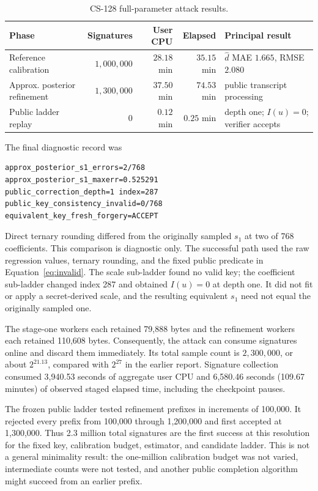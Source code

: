 \documentclass[11pt]{article}
\begin{document}
\begin{table}[ht]
\centering
\caption{CS-128 full-parameter attack results.}
\label{tab:results}
\small
\begin{tabular}{@{}lrrrl@{}}
\toprule
Phase & Signatures & User CPU & Elapsed & Principal result \\
\midrule
Reference calibration & $1{,}000{,}000$ & $28.18$ min & $35.15$ min &
  $\widehat d$ MAE $1.665$, RMSE $2.080$ \\
Approx. posterior refinement & $1{,}300{,}000$ & $37.50$ min & $74.53$ min &
  public transcript processing \\
Public ladder replay & $0$ & $0.12$ min & $0.25$ min &
  depth one; $I(u)=0$; verifier accepts \\
\bottomrule
\end{tabular}
\end{table}

The final diagnostic record was
\begin{verbatim}
approx_posterior_s1_errors=2/768
approx_posterior_s1_maxerr=0.525291
public_correction_depth=1 index=287
public_key_consistency_invalid=0/768
equivalent_key_fresh_forgery=ACCEPT
\end{verbatim}
Direct ternary rounding differed from the originally sampled $s_1$ at two of 768 coefficients.
This comparison is diagnostic only.  The successful path used the raw regression values,
ternary rounding, and the fixed public predicate in Equation~\eqref{eq:invalid}.  The scale
sub-ladder found no valid key; the coefficient sub-ladder changed index 287 and obtained
$I(u)=0$ at depth one.  It did not fit or apply a secret-derived scale, and the resulting
equivalent $s_1$ need not equal the originally sampled one.

The stage-one workers each retained 79,888 bytes and the refinement workers each retained
110,608 bytes.  Consequently, the attack can consume signatures online and discard them
immediately.  Its total sample count is $2{,}300{,}000$, or about $2^{21.13}$, compared with
$2^{27}$ in the earlier report.  Signature collection consumed 3,940.53 seconds of aggregate
user CPU and 6,580.46 seconds (109.67 minutes) of observed staged elapsed time, including the
checkpoint pauses.

The frozen public ladder tested refinement prefixes in increments of 100,000.  It rejected
every prefix from 100,000 through 1,200,000 and first accepted at 1,300,000.  Thus 2.3 million
total signatures are the first success at this resolution for the fixed key, calibration budget,
estimator, and candidate ladder.  This is not a general minimality result: the one-million
calibration budget was not varied, intermediate counts were not tested, and another public
completion algorithm might succeed from an earlier prefix.
\end{document}
